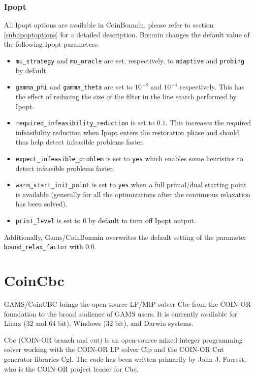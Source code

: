 

\subsubsection{Ipopt}
All Ipopt options are available in CoinBonmin, please refer to section \ref{sub:ipoptoptions} for a detailed description.
Bonmin changes the default value of the following Ipopt parameters:
\begin{itemize}
\item \texttt{mu\_strategy} and \texttt{mu\_oracle} are set, respectively, to {\tt adaptive} and {\tt probing} by default.
\item \texttt{gamma\_phi} and \texttt{gamma\_theta} are set to $10^{-8}$ and $10^{-4}$ respectively. This has the effect of reducing the size of the filter in the line search performed by Ipopt.
\item \texttt{required\_infeasibility\_reduction} is set to $0.1$.
This increases the required infeasibility reduction when Ipopt enters the restoration phase and should thus help
detect infeasible problems faster.
\item \texttt{expect\_infeasible\_problem} is set to {\tt yes} which enables some heuristics to detect infeasible problems faster.
\item \texttt{warm\_start\_init\_point} is set to {\tt yes} when a full primal/dual starting point is available (generally for all the optimizations after the continuous relaxation has been solved).
\item \texttt{print\_level} is set to $0$ by default to turn off Ipopt output.
\end{itemize}

Additionally, Gams/CoinBonmin overwrites the default setting of the parameter \texttt{bound\_relax\_factor} with $0.0$.

\section{CoinCbc}

GAMS/CoinCBC brings the open source LP/MIP solver Cbc from the COIN-OR foundation to the broad audience of GAMS users. It is currently available for Linux (32 and 64 bit), Windows (32 bit), and Darwin systems.

Cbc (COIN-OR branch and cut) is an open-source mixed integer programming solver working with the COIN-OR LP solver Clp and the COIN-OR Cut generator libraries Cgl.
The code has been written primarily by John J. Forrest, who is the COIN-OR project leader for Cbc.

